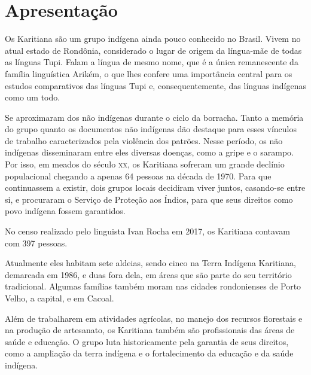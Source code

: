 \chapter{Apresentação}

Os Karitiana são um grupo indígena ainda pouco conhecido no Brasil. Vivem no atual estado de Rondônia, considerado o lugar de origem da
língua-mãe de todas as línguas Tupi. Falam a língua de
mesmo nome, que é a única remanescente da família linguística Arikém, o
que lhes confere uma importância central para os estudos comparativos
das línguas Tupi e, consequentemente, das línguas indígenas como um
todo.

Se aproximaram dos não indígenas durante o ciclo da
borracha. Tanto a memória do grupo quanto os documentos não indígenas dão
destaque para esses vínculos de trabalho caracterizados pela violência
dos patrões. Nesse período, os não indígenas disseminaram entre eles
diversas doenças, como a gripe e o sarampo. Por isso, em meados do
século \textsc{xx}, os Karitiana sofreram um grande declínio populacional 
chegando a apenas 64 pessoas na década de 1970. Para que continuassem a
existir, dois grupos locais decidiram viver juntos, casando-se entre si,
e procuraram o Serviço de Proteção aos Índios, para que seus direitos
como povo indígena fossem garantidos.

No censo realizado pelo linguista Ivan Rocha em 2017, os Karitiana
contavam com 397 pessoas.

Atualmente eles habitam sete aldeias, sendo cinco na Terra Indígena
Karitiana, demarcada em 1986, e duas fora dela, em áreas que são parte
do seu território tradicional. Algumas famílias também moram nas cidades
rondonienses de Porto Velho, a capital, e em Cacoal.

Além de trabalharem em atividades agrícolas, no manejo dos recursos
florestais e na produção de artesanato, os Karitiana também são
profissionais das áreas de saúde e educação. O grupo luta historicamente
pela garantia de seus direitos, como a ampliação da terra indígena e o
fortalecimento da educação e da saúde indígena.